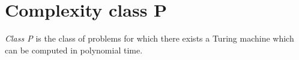 \section{Complexity class P}
\begin{definition}
	\textit{Class P} is the class of problems for which there exists a Turing machine
	which can be computed in polynomial time.
\end{definition}
